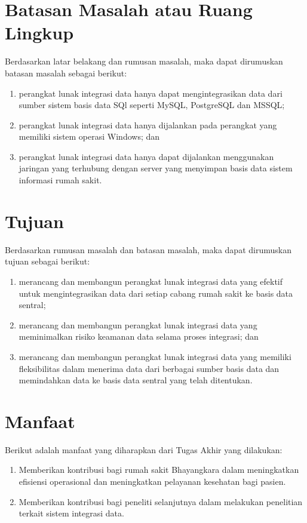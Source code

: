 \section{Batasan Masalah atau Ruang Lingkup}
Berdasarkan latar belakang dan rumusan masalah, maka dapat dirumuskan batasan masalah sebagai berikut:
\begin{enumerate}
    \item perangkat lunak integrasi data hanya dapat mengintegrasikan data dari sumber sistem basis data SQl seperti MySQL, PostgreSQL dan MSSQL;
    \item perangkat lunak integrasi data hanya dijalankan pada perangkat yang memiliki sistem operasi Windows; dan
    \item perangkat lunak integrasi data hanya dapat dijalankan menggunakan jaringan yang terhubung dengan server yang menyimpan basis data sistem informasi rumah sakit.
\end{enumerate}

\section{Tujuan}
Berdasarkan rumusan masalah dan batasan masalah, maka dapat dirumuskan tujuan sebagai berikut:
\begin{enumerate}
    \item merancang dan membangun perangkat lunak integrasi data yang efektif untuk mengintegrasikan data dari setiap cabang rumah sakit ke basis data sentral;
    \item merancang dan membangun perangkat lunak integrasi data yang meminimalkan risiko keamanan data selama proses integrasi; dan
    \item merancang dan membangun perangkat lunak integrasi data yang memiliki fleksibilitas dalam menerima data dari berbagai sumber basis data dan memindahkan data ke basis data sentral yang telah ditentukan.
\end{enumerate}

\section{Manfaat}
Berikut adalah manfaat yang diharapkan dari Tugas Akhir yang dilakukan:
\begin{enumerate}
    \item Memberikan kontribusi bagi rumah sakit Bhayangkara dalam meningkatkan efisiensi operasional dan meningkatkan pelayanan kesehatan bagi pasien.
    \item Memberikan kontribusi bagi peneliti selanjutnya dalam melakukan penelitian terkait sistem integrasi data.
\end{enumerate}

